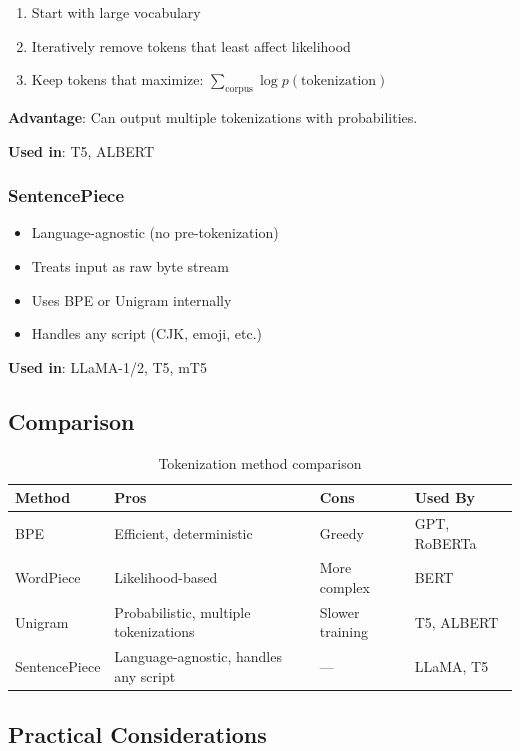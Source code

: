 \begin{enumerate}
    \item Start with large vocabulary
    \item Iteratively remove tokens that least affect likelihood
    \item Keep tokens that maximize: $\sum_{\text{corpus}} \log p(\text{tokenization})$
\end{enumerate}

\textbf{Advantage}: Can output multiple tokenizations with probabilities.

\textbf{Used in}: T5, ALBERT

\subsubsection{SentencePiece}

\begin{itemize}
    \item Language-agnostic (no pre-tokenization)
    \item Treats input as raw byte stream
    \item Uses BPE or Unigram internally
    \item Handles any script (CJK, emoji, etc.)
\end{itemize}

\textbf{Used in}: LLaMA-1/2, T5, mT5

\subsection{Comparison}

\begin{table}[H]
\centering
\caption{Tokenization method comparison}
\begin{tabularx}{\textwidth}{lXXX}
\toprule
\textbf{Method} & \textbf{Pros} & \textbf{Cons} & \textbf{Used By} \\
\midrule
BPE & Efficient, deterministic & Greedy & GPT, RoBERTa \\
WordPiece & Likelihood-based & More complex & BERT \\
Unigram & Probabilistic, multiple tokenizations & Slower training & T5, ALBERT \\
SentencePiece & Language-agnostic, handles any script & — & LLaMA, T5 \\
\bottomrule
\end{tabularx}
\end{table}

\subsection{Practical Considerations}

